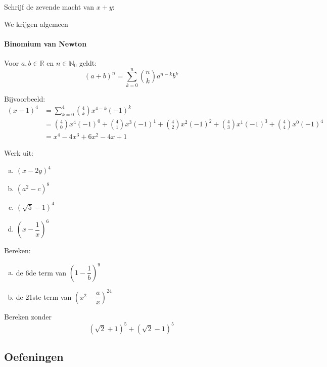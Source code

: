 \documentclass[12pt,twoside]{article}
\begin{document}
\begin{theorie}
Schrijf de zevende macht van $x+y$:

We krijgen algemeen
\paragraph{Binomium van Newton}
\begin{mdframed}
Voor $a,b\in\mathbb{R}$ en $n\in\mathbb{N}_0$ geldt:
$$(a+b)^n=\sum^n_{k=0}{n \choose k}a^{n-k}b^k$$
\end{mdframed}

Bijvoorbeeld:
\begin{align*}\displaystyle
  (x-1)^4 &= \sum^4_{k=0}{4 \choose k}x^{4-k}(-1)^k\\
          &= {4 \choose 0}x^4(-1)^0 + {4 \choose 1}x^3(-1)^1+{4 \choose 2}x^2(-1)^2+{4 \choose 3}x^1(-1)^3+{4 \choose 4}x^0(-1)^4\\
          &=x^4-4x^3+6x^2-4x+1
\end{align*}

\end{theorie}

\begin{oefening}
Werk uit:
\begin{enumerate}[(a)]
  \item $\left(x-2y\right)^4$
  \item $\left(a^2-c\right)^8$
  \item $\left(\sqrt{5}-1\right)^4$
  \item $\left(x-\dfrac{1}{x}\right)^6$
\end{enumerate}
\end{oefening}

\begin{oefening}
Bereken:
\begin{enumerate}[(a)]
  \item de 6de term van $\left(1-\dfrac{1}{b}\right)^9$
  \item de 21ste term van $\left(x^2-\dfrac{a}{x}\right)^{24}$
\end{enumerate}
\end{oefening}

\begin{oefening}
Bereken zonder  $$\left(\sqrt{2}+1\right)^5+\left(\sqrt{2}-1\right)^5$$
\end{oefening}

\begin{theorie}
\pagebreak
\subsection{Oefeningen}  %

\end{theorie}
\end{document}
